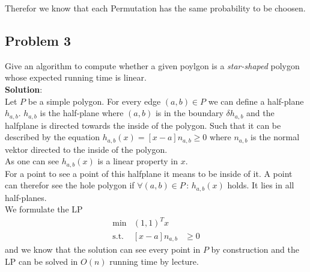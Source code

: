\documentclass[11pt,a4paper,ngerman]{article}
\begin{document}
Therefor we know that each Permutation has the same probability to be choosen.

\subsection*{Problem 3}

Give an algorithm to compute whether a given poylgon is a \emph{star-shaped} polygon whose expected running time is
linear.\\

\textbf{Solution}:\\

Let $P$ be a simple polygon. For every edge $(a,b) \in P$ we can define a half-plane $h_{a,b}$.
$h_{a,b}$ is the half-plane where $(a,b)$ is in the boundary $\delta h_{a,b}$ and the halfplane
is directed towards the inside of the polygon. Such that it
can be described by the equation $h_{a,b}(x) = \left[x - a \right] n_{a,b} \geq 0$ where $n_{a,b}$ is 
the normal vektor directed to the inside of the polygon.\\

As one can see $h_{a,b}(x)$ is a linear property in $x$.\\

For a point to see a point of this halfplane it means to be inside of it. A point can therefor see
the hole polygon if $\forall (a,b) \in P \, : \, h_{a,b}(x)$ holds. It lies in all half-planes.\\

We formulate the LP
\begin{equation*}\begin{array}{rlcr}
    \min & (1,1)^T x\\
    \text{s.t.} & \left[ x - a \right] n_{a,b} & \geq 0
\end{array}\end{equation*}
and we know that the solution can see every point in $P$ by construction
and the LP can be solved in $O(n)$ running time by lecture.

\label{LastPage}
\end{document}
